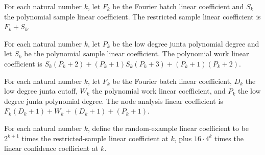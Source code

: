 \begin{definition}
\label{FABL.lowDegreeJuntaRestrictedSampleLinearCoefficient}
\leanok
{}
For each natural number $k$, let $F_k$ be the Fourier batch linear coefficient and $S_k$
the polynomial sample linear coefficient. The restricted sample linear coefficient is
$F_k+S_k$.
\end{definition}

\begin{definition}
\label{FABL.lowDegreeJuntaPolynomialWorkLinearCoefficient}
\leanok
{}
For each natural number $k$, let $P_k$ be the low degree junta polynomial degree and let
$S_k$ be the polynomial sample linear coefficient. The polynomial work linear
coefficient is $S_k(P_k+2)+(P_k+1)S_k(P_k+3)+(P_k+1)(P_k+2)$.
\end{definition}

\begin{definition}
\label{FABL.lowDegreeJuntaNodeAnalysisLinearCoefficient}
\leanok
{}
For each natural number $k$, let $F_k$ be the Fourier batch linear coefficient, $D_k$
the low degree junta cutoff, $W_k$ the polynomial work linear coefficient, and $P_k$ the
low degree junta polynomial degree. The node analysis linear coefficient is
$F_k(D_k+1)+W_k+(D_k+1)+(P_k+1)$.
\end{definition}

\begin{definition}
\label{FABL.lowDegreeJuntaNodeRandomExampleLinearCoefficient}
\leanok
{}
For each natural number $k$, define the random-example linear coefficient to be
$2^{k+1}$ times the restricted-sample linear coefficient at $k$, plus $16\cdot 4^k$
times the linear confidence coefficient at $k$.
\end{definition}

